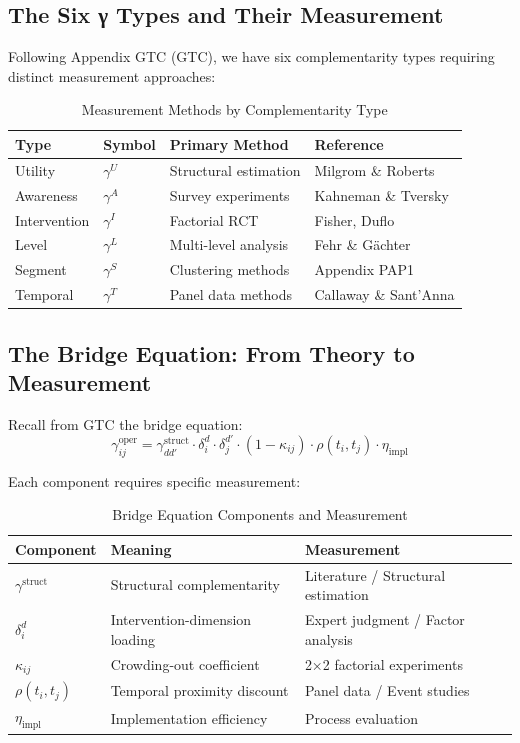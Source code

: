 \subsection{The Six γ Types and Their Measurement}
\label{subsec:six-gamma-measurement}

Following Appendix GTC (GTC), we have six complementarity types requiring distinct measurement approaches:

\begin{table}[h]
\centering
\caption{Measurement Methods by Complementarity Type}
\label{tab:gamma-measurement}
\begin{tabular}{llll}
\hline
\textbf{Type} & \textbf{Symbol} & \textbf{Primary Method} & \textbf{Reference} \\
\hline
Utility & $\gamma^U$ & Structural estimation & Milgrom \& Roberts \\
Awareness & $\gamma^A$ & Survey experiments & Kahneman \& Tversky \\
Intervention & $\gamma^I$ & Factorial RCT & Fisher, Duflo \\
Level & $\gamma^L$ & Multi-level analysis & Fehr \& Gächter \\
Segment & $\gamma^S$ & Clustering methods & Appendix PAP1 \\
Temporal & $\gamma^T$ & Panel data methods & Callaway \& Sant'Anna \\
\hline
\end{tabular}
\end{table}

\subsection{The Bridge Equation: From Theory to Measurement}
\label{subsec:bridge-measurement}

Recall from GTC the bridge equation:
\begin{equation}
\gamma^{\text{oper}}_{ij} = \gamma^{\text{struct}}_{dd'} \cdot \delta_i^d \cdot \delta_j^{d'} \cdot (1 - \kappa_{ij}) \cdot \rho(t_i, t_j) \cdot \eta_{\text{impl}}
\end{equation}

Each component requires specific measurement:

\begin{table}[h]
\centering
\caption{Bridge Equation Components and Measurement}
\label{tab:bridge-measurement}
\begin{tabular}{lll}
\hline
\textbf{Component} & \textbf{Meaning} & \textbf{Measurement} \\
\hline
$\gamma^{\text{struct}}$ & Structural complementarity & Literature / Structural estimation \\
$\delta_i^d$ & Intervention-dimension loading & Expert judgment / Factor analysis \\
$\kappa_{ij}$ & Crowding-out coefficient & 2×2 factorial experiments \\
$\rho(t_i, t_j)$ & Temporal proximity discount & Panel data / Event studies \\
$\eta_{\text{impl}}$ & Implementation efficiency & Process evaluation \\
\hline
\end{tabular}
\end{table}


